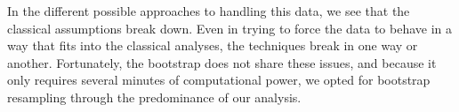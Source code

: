 \par In the different possible approaches to handling this data, we see that the classical assumptions break down.  Even in trying to force the data to behave in a way that fits into the classical analyses, the techniques break in one way or another.  Fortunately, the bootstrap does not share these issues, and because it only requires several minutes of computational power, we opted for bootstrap resampling through the predominance of our analysis.

